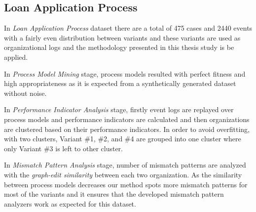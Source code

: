 \subsection{Loan Application Process}
\label{subsec:loan-app-process}

In \textit{Loan Application Process} dataset there are a total of 475 cases and 2440 events with a fairly even distribution between variants and these variants are used as organizational logs and the methodology presented in this thesis study is be applied.

In \textit{Process Model Mining} stage, process models resulted with perfect fitness and high appropriateness as it is expected from a synthetically generated dataset without noise. 

In \textit{Performance Indicator Analysis} stage, firstly event logs are replayed over process models and performance indicators are calculated and then organizations are clustered based on their performance indicators. In order to avoid overfitting,  with two clusters, Variant \#1, \#2, and \#4 are grouped into one cluster where only Variant \#3 is left to other cluster.

In \textit{Mismatch Pattern Analysis} stage, number of mismatch patterns are analyzed with the \textit{graph-edit similarity} between each two organization. As the similarity between process models decreases our method spots more mismatch patterns for most of the variants and it ensures that the developed mismatch pattern analyzers work as expected for this dataset. 

